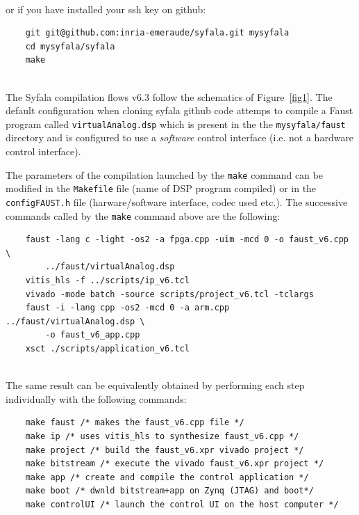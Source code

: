 \documentclass[11pt]{article}
\numberwithin{equation}{section}
\numberwithin{figure}{section}
\newcommand{\syfala}{{Syfala}\xspace}
\begin{document}
~\\

or if you have installed your ssh key on github:\\

\begin{boxedminipage}{\textwidth}
  \begin{verbatim}
    git git@github.com:inria-emeraude/syfala.git mysyfala
    cd mysyfala/syfala
    make
\end{verbatim}
\end{boxedminipage}

~\\

The  \syfala compilation flows v6.3 follow the schematics of Figure~\ref{fig1}. The default configuration when cloning syfala github code attemps to compile a Faust program called {\tt virtualAnalog.dsp} which is present in the the {\tt mysyfala/faust} directory and  is configured to use a {\em software} control interface (i.e. not a hardware control interface).

The parameters of the compilation launched by the {\tt make} command can be modified in the {\tt Makefile} file (name of DSP program compiled) or in the {\tt configFAUST.h} file (harware/software interface, codec used etc.). The successive commands called by the {\tt make} command above are the following:\\

  \begin{boxedminipage}{\textwidth}
  \begin{verbatim}
    faust -lang c -light -os2 -a fpga.cpp -uim -mcd 0 -o faust_v6.cpp \
        ../faust/virtualAnalog.dsp
    vitis_hls -f ../scripts/ip_v6.tcl
    vivado -mode batch -source scripts/project_v6.tcl -tclargs 
    faust -i -lang cpp -os2 -mcd 0 -a arm.cpp ../faust/virtualAnalog.dsp \
        -o faust_v6_app.cpp
    xsct ./scripts/application_v6.tcl
\end{verbatim}
\end{boxedminipage}

  ~\\
  The same result can be equivalently obtained by performing each step individually with the following commands:\\

  \begin{boxedminipage}{\textwidth}
  \begin{verbatim}
    make faust /* makes the faust_v6.cpp file */
    make ip /* uses vitis_hls to synthesize faust_v6.cpp */
    make project /* build the faust_v6.xpr vivado project */
    make bitstream /* execute the vivado faust_v6.xpr project */
    make app /* create and compile the control application */
    make boot /* dwnld bitstream+app on Zynq (JTAG) and boot*/
    make controlUI /* launch the control UI on the host computer */
\end{verbatim}
\end{boxedminipage}
  
\end{document}
